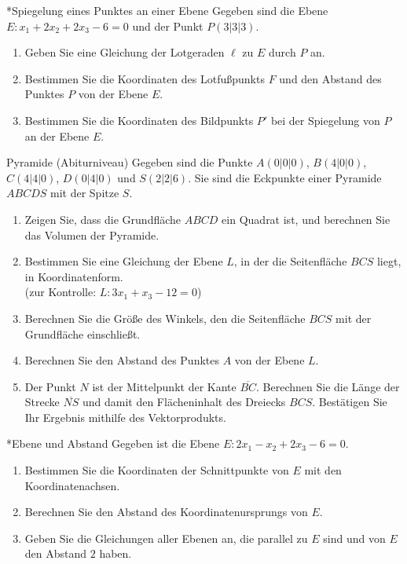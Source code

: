 \begin{uebung}*{Spiegelung eines Punktes an einer Ebene}
Gegeben sind die Ebene $E: x_1+2x_2+2x_3-6=0$ und der Punkt $P(3|3|3)$.
\begin{enumerate}[label=\alph*)]
  \item Geben Sie eine Gleichung der Lotgeraden $\ell$ zu $E$ durch $P$ an.
  \item Bestimmen Sie die Koordinaten des Lotfußpunkts $F$ und den Abstand des Punktes $P$ von der Ebene $E$.
  \item Bestimmen Sie die Koordinaten des Bildpunkts $P'$ bei der Spiegelung von $P$ an der Ebene $E$.
\end{enumerate}
\end{uebung}

\begin{uebung}{Pyramide (Abiturniveau)}
Gegeben sind die Punkte $A(0|0|0)$, $B(4|0|0)$, $C(4|4|0)$, $D(0|4|0)$ und $S(2|2|6)$. Sie sind die Eckpunkte einer Pyramide $ABCDS$ mit der Spitze $S$.
\begin{enumerate}[label=\alph*)]
  \item Zeigen Sie, dass die Grundfläche $ABCD$ ein Quadrat ist, und berechnen Sie das Volumen der Pyramide.
  \item Bestimmen Sie eine Gleichung der Ebene $L$, in der die Seitenfläche $BCS$ liegt, in Koordinatenform.\\
  {\small (zur Kontrolle: $L: 3x_1+x_3-12=0$)}
  \item Berechnen Sie die Größe des Winkels, den die Seitenfläche $BCS$ mit der Grundfläche einschließt.
  \item Berechnen Sie den Abstand des Punktes $A$ von der Ebene $L$.
  \item Der Punkt $N$ ist der Mittelpunkt der Kante $\overline{BC}$. Berechnen Sie die Länge der Strecke $\overline{NS}$ und damit den Flächeninhalt des Dreiecks $BCS$. Bestätigen Sie Ihr Ergebnis mithilfe des Vektorprodukts.
\end{enumerate}
\end{uebung}


\begin{uebung}*{Ebene und Abstand}
Gegeben ist die Ebene $E: 2x_1-x_2+2x_3-6=0$.
\begin{enumerate}[label=\alph*)]
  \item Bestimmen Sie die Koordinaten der Schnittpunkte von $E$ mit den Koordinatenachsen.
  \item Berechnen Sie den Abstand des Koordinatenursprungs von $E$.
  \item Geben Sie die Gleichungen aller Ebenen an, die parallel zu $E$ sind und von $E$ den Abstand $2$ haben.
\end{enumerate}
\end{uebung}


